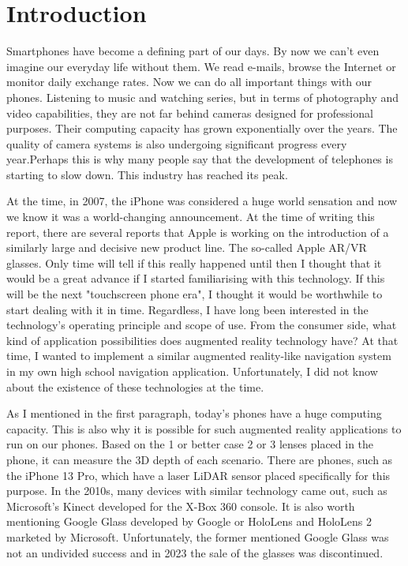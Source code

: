 \chapter{Introduction}

Smartphones have become a defining part of our days. By now we can't even imagine our everyday life without them. We read e-mails, browse the Internet or monitor daily exchange rates. Now we can do all important things with our phones. Listening to music and watching series, but in terms of photography and video capabilities, they are not far behind cameras designed for professional purposes. Their computing capacity has grown exponentially over the years. The quality of camera systems is also undergoing significant progress every year.Perhaps this is why many people say that the development of telephones is starting to slow down. This industry has reached its peak.

At the time, in 2007, the iPhone was considered a huge world sensation and now we know it was a world-changing announcement. At the time of writing this report, there are several reports that Apple is working on the introduction of a similarly large and decisive new product line. The so-called Apple AR/VR glasses. Only time will tell if this really happened until then I thought that it would be a great advance if I started familiarising with this technology. If this will be the next "touchscreen phone era", I thought it would be worthwhile to start dealing with it in time. Regardless, I have long been interested in the technology's operating principle and scope of use. From the consumer side, what kind of application possibilities does augmented reality technology have? At that time, I wanted to implement a similar augmented reality-like navigation system in my own high school navigation application. Unfortunately, I did not know about the existence of these technologies at the time.

As I mentioned in the first paragraph, today's phones have a huge computing capacity. This is also why it is possible for such augmented reality applications to run on our phones. Based on the 1 or better case 2 or 3 lenses placed in the phone, it can measure the 3D depth of each scenario. There are phones, such as the iPhone 13 Pro, which have a laser LiDAR sensor placed specifically for this purpose. In the 2010s, many devices with similar technology came out, such as Microsoft's Kinect developed for the X-Box 360 console. It is also worth mentioning Google Glass developed by Google or HoloLens and HoloLens 2 marketed by Microsoft. Unfortunately, the former mentioned Google Glass was not an undivided success and in 2023 the sale of the glasses was discontinued.

